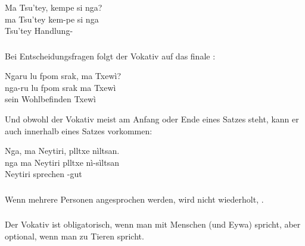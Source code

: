\begin{interlin}
	\glll \Nfilm{}Ma Tsu'tey, kempe si nga? \\
	ma Tsu'tey kem-pe si nga \\
	 Tsu'tey Handlung-   \\
\end{interlin}

\subsubsection{} Bei Entscheidungsfragen folgt der Vokativ auf das finale : 

\begin{interlin}
	\glll Ngaru lu fpom srak, ma Txewì? \\
	nga-ru lu fpom srak ma Txewì \\
	 sein Wohlbefinden   Txewì \\
\end{interlin}

\noindent Und obwohl der Vokativ meist am Anfang oder Ende eines Satzes steht, kann er auch innerhalb eines Satzes vorkommen:

\begin{interlin}
	\glll Nga, ma Neytiri, plltxe nìltsan. \\
	nga ma Neytiri plltxe nì-sìltsan \\
	  Neytiri sprechen -gut \\
\end{interlin}

\subsubsection{} Wenn mehrere Personen angesprochen werden, wird  nicht wiederholt,  .

\subsubsection{}
Der Vokativ ist obligatorisch, wenn man mit Menschen (und Eywa) spricht, aber optional, wenn man zu Tieren spricht.

